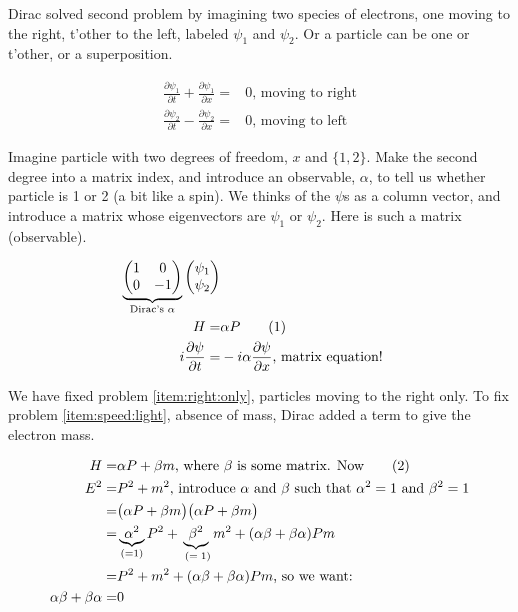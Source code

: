 \documentclass[]{article}
\newcommand\numberthis{\addtocounter{equation}{1}\tag{\theequation}}
\begin{document}
Dirac solved second problem by imagining two species of electrons, one moving to the right, t'other to the left, labeled $\psi_1$ and $\psi_2$. Or a particle can be one or t'other, or a superposition.

\begin{align*}
	\frac{\partial \psi_1}{\partial t} + \frac{\partial \psi_1}{\partial x}=&0 \text{, moving to right}\\
	\frac{\partial \psi_2}{\partial t} - \frac{\partial \psi_2}{\partial x}=&0 \text{, moving to left}
\end{align*}

Imagine particle with two degrees of freedom, $x$ and $\{1,2\}$. Make the second degree into a matrix index, and introduce an observable, $\alpha$, to tell us whether particle is 1 or 2 (a bit like a spin). We thinks of the $\psi$s as a column vector, and introduce a matrix whose eigenvectors are $\psi_1$ or $\psi_2$. Here is such a matrix (observable).

\begin{align*}
	\underbrace{
		\begin{pmatrix}
			1 & 0\\
			0 & -1
		\end{pmatrix}
	}_\text{Dirac's $\alpha$}
	\begin{pmatrix}
		\psi_1\\
		\psi_2
	\end{pmatrix}\\
	H =& \alpha P \numberthis \label{eq:dirac:1d:hp}\\
	i\frac{\partial \psi}{\partial t} =& -i \alpha \frac{\partial \psi}{\partial x} \text{, matrix equation!}
\end{align*}

We have fixed problem \ref{item:right:only}, particles moving to the right only. To fix problem \ref{item:speed:light}, absence of mass, Dirac added a term to give the electron mass. 

\begin{align*}
	H =& \alpha P + \beta m \text{, where $\beta$ is some matrix. Now} \numberthis \label{eq:dirac:1D:m}\\
	E^2 =& P^2 + m^2 \text{, introduce $\alpha$ and  $\beta$ such that $\alpha^2=1$ and $\beta^2=1$}\\
	=& \big(\alpha P + \beta m \big) \big(\alpha P + \beta m \big) \\
	=& \underbrace{\alpha^2}_\text{(=1)} P^2 + \underbrace{\beta^2 }_\text{  $(=1)$} m^2 + (\alpha \beta + \beta \alpha) P m \\\
	=&  P^2 + m^2 + (\alpha \beta + \beta \alpha) P m \text{, so we want:}\\
	\alpha \beta + \beta \alpha=&0 
\end{align*}
\end{document}
